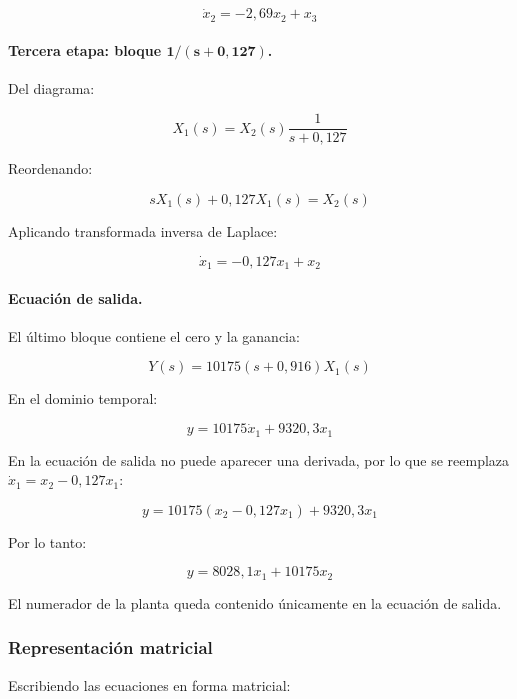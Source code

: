 \documentclass[12pt,a4paper]{article}
\begin{document}
\begin{equation}\boxed{\dot{x}_2=-2{,}69x_2+x_3}\end{equation}
\paragraph{Tercera etapa: bloque $\boldsymbol{1/(s+0{,}127)}$.} Del diagrama:

\begin{equation}X_1(s)=X_2(s)\frac{1}{s+0{,}127}\end{equation}

Reordenando:

\begin{equation}sX_1(s)+0{,}127X_1(s)=X_2(s)\end{equation}

Aplicando transformada inversa de Laplace:

\begin{equation}\boxed{\dot{x}_1=-0{,}127x_1+x_2}\end{equation}
\paragraph{Ecuación de salida.} El último bloque contiene el cero y la ganancia:

\begin{equation}Y(s)=10175(s+0{,}916)X_1(s)\end{equation}

En el dominio temporal:

\begin{equation}y=10175\dot{x}_1+9320{,}3x_1\end{equation}

En la ecuación de salida no puede aparecer una derivada, por lo que se reemplaza $\dot{x}_1=x_2-0{,}127x_1$:

\begin{equation}y=10175(x_2-0{,}127x_1)+9320{,}3x_1\end{equation}

Por lo tanto:

\begin{equation}\boxed{y=8028{,}1x_1+10175x_2}\end{equation}

El numerador de la planta queda contenido únicamente en la ecuación de salida.
\subsubsection*{Representación matricial}
Escribiendo las ecuaciones en forma matricial:
\end{document}
